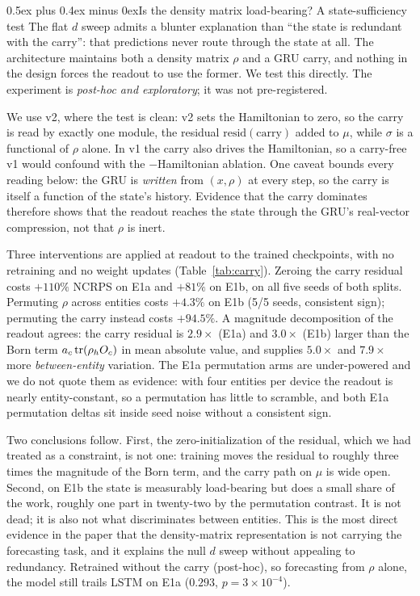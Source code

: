 \documentclass[journal]{IEEEtran}
\makeatletter
\def\subsection{\@startsection{subsection}{2}{\z@}{1.8ex plus 1ex minus 0.75ex}%
{0.5ex plus 0.4ex minus 0ex}{\normalfont\normalsize\itshape}}
\makeatother
\begin{document}


\subsection{Is the density matrix load-bearing? A state-sufficiency
test}\label{sec:carry}
The flat $d$ sweep admits a blunter explanation than ``the state is redundant with
the carry'': that predictions never route through the state at all. The architecture
maintains both a density matrix $\rho$ and a GRU carry, and nothing in the design
forces the readout to use the former. We test this directly. The experiment is
\emph{post-hoc and exploratory}; it was not pre-registered.

We use v2, where the test is clean: v2 sets the Hamiltonian to zero, so the carry is
read by exactly one module, the residual $\mathrm{resid}(\text{carry})$ added to
$\mu$, while $\sigma$ is a functional of $\rho$ alone. In v1 the carry also drives
the Hamiltonian, so a carry-free v1 would confound with the $-$Hamiltonian ablation.
One caveat bounds every reading below: the GRU is \emph{written} from
$(x, \rho)$ at every step, so the carry is itself a function of the state's history.
Evidence that the carry dominates therefore shows that the readout reaches the state
through the GRU's real-vector compression, not that $\rho$ is inert.

Three interventions are applied at readout to the trained checkpoints, with no
retraining and no weight updates (Table~\ref{tab:carry}). Zeroing the carry residual
costs $+110\%$ NCRPS on E1a and $+81\%$ on E1b, on all five seeds of both splits.
Permuting $\rho$ across entities costs $+4.3\%$ on E1b (5/5 seeds, consistent sign);
permuting the carry instead costs $+94.5\%$. A magnitude decomposition of the readout
agrees: the carry residual is $2.9\times$ (E1a) and $3.0\times$ (E1b) larger than the
Born term $a_c\tr(\rho_h O_c)$ in mean absolute value, and supplies $5.0\times$ and
$7.9\times$ more \emph{between-entity} variation. The E1a permutation arms are
under-powered and we do not quote them as evidence: with four entities per device the
readout is nearly entity-constant, so a permutation has little to scramble, and both
E1a permutation deltas sit inside seed noise without a consistent sign.

Two conclusions follow. First, the zero-initialization of the residual, which we had
treated as a constraint, is not one: training moves the residual to roughly three
times the magnitude of the Born term, and the carry path on $\mu$ is wide open.
Second, on E1b the state is measurably load-bearing but does a small share of the
work, roughly one part in twenty-two by the permutation contrast. It is not dead;
it is also not what discriminates between entities. This is the most direct evidence
in the paper that the density-matrix representation is not carrying the forecasting
task, and it explains the null $d$ sweep without appealing to redundancy.
Retrained without the carry (post-hoc), so forecasting from $\rho$ alone, the model
still trails LSTM on E1a ($0.293$, $p=3\times10^{-4}$).
\end{document}
